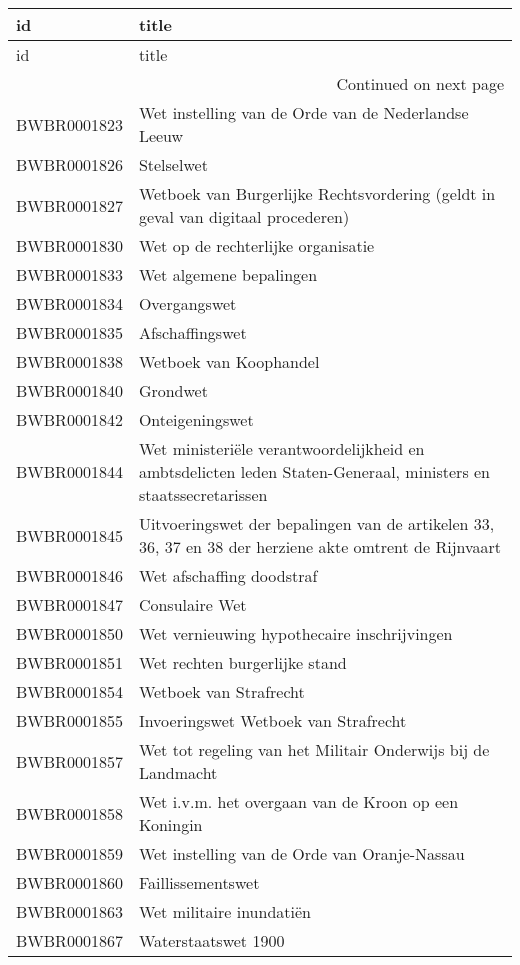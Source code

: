 \begin{longtable}{lp{}}
\toprule
id & title \\
\midrule
\endfirsthead
\toprule
id & title \\
\midrule
\endhead
\midrule
\multicolumn{2}{r}{Continued on next page} \\
\midrule
\endfoot
\bottomrule
\endlastfoot
BWBR0001823 & Wet instelling van de Orde van de Nederlandse Leeuw \\
BWBR0001826 & Stelselwet \\
BWBR0001827 & Wetboek van Burgerlijke Rechtsvordering (geldt in geval van digitaal procederen) \\
BWBR0001830 & Wet op de rechterlijke organisatie \\
BWBR0001833 & Wet algemene bepalingen  \\
BWBR0001834 & Overgangswet \\
BWBR0001835 & Afschaffingswet \\
BWBR0001838 & Wetboek van Koophandel \\
BWBR0001840 & Grondwet \\
BWBR0001842 & Onteigeningswet \\
BWBR0001844 & Wet ministeriële verantwoordelijkheid en ambtsdelicten leden Staten-Generaal, ministers en staatssecretarissen \\
BWBR0001845 & Uitvoeringswet der bepalingen van de artikelen 33, 36, 37 en 38 der herziene akte omtrent de Rijnvaart \\
BWBR0001846 & Wet afschaffing doodstraf \\
BWBR0001847 & Consulaire Wet \\
BWBR0001850 & Wet vernieuwing hypothecaire inschrijvingen \\
BWBR0001851 & Wet rechten burgerlijke stand \\
BWBR0001854 & Wetboek van Strafrecht \\
BWBR0001855 & Invoeringswet Wetboek van Strafrecht \\
BWBR0001857 & Wet tot regeling van het Militair Onderwijs bij de Landmacht \\
BWBR0001858 & Wet i.v.m. het overgaan van de Kroon op een Koningin \\
BWBR0001859 & Wet instelling van de Orde van Oranje-Nassau \\
BWBR0001860 & Faillissementswet \\
BWBR0001863 & Wet militaire inundatiën \\
BWBR0001867 & Waterstaatswet 1900 \\

\end{longtable}
